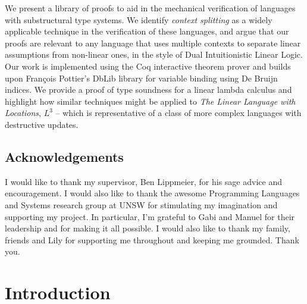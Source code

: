 \documentclass[]{unswthesis}
\newenvironment{abstract}
 {
  \begin{center}
  \bfseries \abstractname\vspace{-.5em}\vspace{0pt}
  \end{center}
  \list{}{
    \setlength{\leftmargin}{.5cm}%
    \setlength{\rightmargin}{\leftmargin}%
  }%
  \item\relax}
 {\endlist}
\newcommand{\Francois}{Fran\frenchc{c}ois }
\let\frenchc\c
\let\c\texttt
\let\i\textit
\begin{document}
\frontmatter
\maketitle


\begin{abstract}
We present a library of proofs to aid in the mechanical verification of languages with substructural type systems. We identify \i{context splitting} as a widely applicable technique in the verification of these languages, and argue that our proofs are relevant to any language that uses multiple contexts to separate linear assumptions from non-linear ones, in the style of Dual Intuitionistic Linear Logic. Our work is implemented using the Coq interactive theorem prover and builds upon \Francois Pottier's DbLib library for variable binding using De Bruijn indices. We provide a proof of type soundness for a linear lambda calculus and highlight how similar techniques might be applied to \i{The Linear Language with Locations}, $L^3$ -- which is representative of a class of more complex languages with destructive updates.
\end{abstract}

\newpage

\section*{Acknowledgements}

I would like to thank my supervisor, Ben Lippmeier, for his sage advice and encouragement. I would also like to thank the awesome Programming Languages and Systems research group at UNSW for stimulating my imagination and supporting my project. In particular, I'm grateful to Gabi and Manuel for their leadership and for making it all possible. I would also like to thank my family, friends and Lily for supporting me throughout and keeping me grounded. Thank you.

\tableofcontents

\mainmatter

\chapter{Introduction}
\label{ch:intro}
\end{document}

